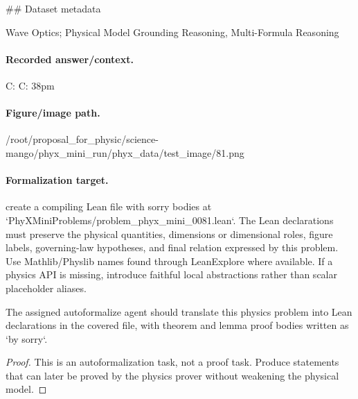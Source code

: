 \#\# Dataset metadata

Wave Optics; Physical Model Grounding Reasoning, Multi-Formula Reasoning

\paragraph{Recorded answer/context.}
C: C: 38pm

\paragraph{Figure/image path.}
/root/proposal\_for\_physic/science-mango/phyx\_mini\_run/phyx\_data/test\_image/81.png

\paragraph{Formalization target.}
create a compiling Lean file with sorry bodies at `PhyXMiniProblems/problem\_phyx\_mini\_0081.lean`. The Lean declarations must preserve the physical quantities, dimensions or dimensional roles, figure labels, governing-law hypotheses, and final relation expressed by this problem.
Use Mathlib/Physlib names found through LeanExplore where available. If a physics API is missing, introduce faithful local abstractions rather than scalar placeholder aliases.

\begin{theorem}
\label{thm:physics:phyx_mini_0081:target}
The assigned autoformalize agent should translate this physics problem into Lean declarations in the covered file, with theorem and lemma proof bodies written as `by sorry`.
\end{theorem}
\begin{proof}
This is an autoformalization task, not a proof task. Produce statements that can later be proved by the physics prover without weakening the physical model.
\end{proof}

